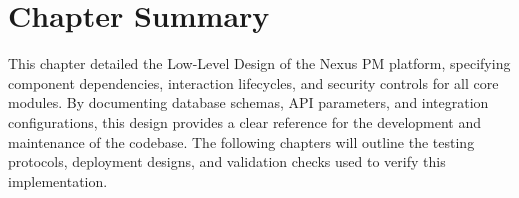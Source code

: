 \section{Chapter Summary}
This chapter detailed the Low-Level Design of the Nexus PM platform, specifying component dependencies, interaction lifecycles, and security controls for all core modules. By documenting database schemas, API parameters, and integration configurations, this design provides a clear reference for the development and maintenance of the codebase. The following chapters will outline the testing protocols, deployment designs, and validation checks used to verify this implementation.
